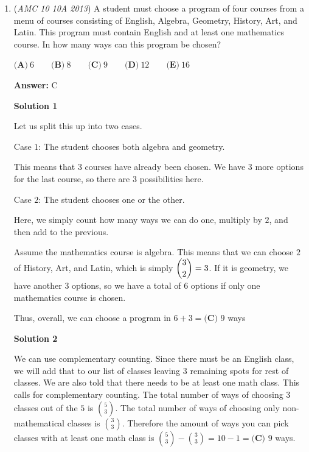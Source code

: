 \begin{enumerate}
\textbf{Solution 2}

There are only $4$ kids who are under $10$ but since the $5$-year old stayed home, the only possible ages who went to play baseball are the brothers who are $3,7,9$, either $13+3$ or $7+9$ is $16$ but since we need $2$ kids to go to baseball who are under $10$, $13,3$ must have been the pair to go to the movies and $9,7$ must have went to baseball, so only the $11$-year old is left, which is answer choice $\boxed{\textbf{(D) }11}$



	\item (\textit{AMC 10 10A 2013}) A student must choose a program of four courses from a menu of courses consisting of English, Algebra, Geometry, History, Art, and Latin. This program must contain English and at least one mathematics course. In how many ways can this program be chosen?


 $\textbf{(A)}\ 6\qquad\textbf{(B)}\ 8\qquad\textbf{(C)}\ 9\qquad\textbf{(D)}\ 12\qquad\textbf{(E)}\ 16$

 \textbf{Answer: }C



\textbf{Solution 1}

Let us split this up into two cases.

 Case $1$: The student chooses both algebra and geometry.

 This means that $3$ courses have already been chosen.  We have $3$ more options for the last course, so there are $3$ possibilities here.  

 Case $2$: The student chooses one or the other.  

 Here, we simply count how many ways we can do one, multiply by $2$, and then add to the previous.  

 Assume the mathematics course is algebra.  This means that we can choose $2$ of History, Art, and Latin, which is simply $\dbinom{3}{2} = 3$.  If it is geometry, we have another $3$ options, so we have a total of $6$ options if only one mathematics course is chosen.

 Thus, overall, we can choose a program in $6 + 3 = \boxed{\textbf{(C) }9}$ ways

 



\textbf{Solution 2}

We can use complementary counting. Since there must be an English class, we will add that to our list of classes leaving $3$ remaining spots for rest of classes. We are also told that there needs to be at least one math class. This calls for complementary counting. The total number of ways of choosing $3$ classes out of the $5$ is $\binom{5}3$. The total number of ways of choosing only non-mathematical classes is $\binom{3}3$. Therefore the amount of ways you can pick classes with at least one math class is $\binom{5}3-\binom{3}3=10-1=\boxed{\textbf{(C) }9}$ ways.


\end{enumerate}
